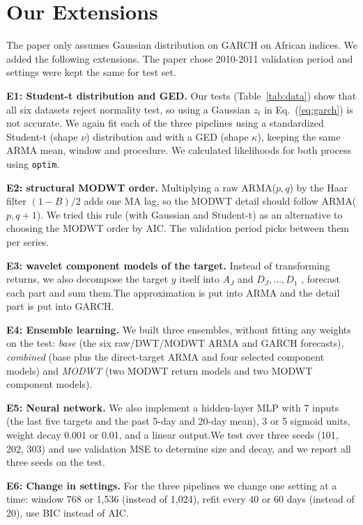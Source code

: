 \documentclass{article}
\begin{document}
\section{Our Extensions}
\label{sec:ext}

The paper only assumes Gaussian distribution on GARCH on African indices. We added the following extensions. The paper chose 2010-2011 validation period and settings were kept the same for test set.

\textbf{E1: Student-t distribution and GED.} Our tests (Table~\ref{tab:data}) show that all six datasets reject normality test, so using a Gaussian $z_t$ in Eq.~(\ref{eq:garch}) is not accurate. We again fit each of the three pipelines using a standardized Student-t (shape $\nu$) distribution and with a GED (shape $\kappa$), keeping the same ARMA mean, window and procedure. We calculated likelihoods for both process using \texttt{optim}.

\textbf{E2: structural MODWT order.} Multiplying a raw ARMA($p,q$) by the Haar filter $(1-B)/2$ adds one MA lag, so the MODWT detail should follow ARMA($p,q+1$). We tried this rule (with Gaussian and Student-t) as an alternative to choosing the MODWT order by AIC. The validation period picks between them per series.

\textbf{E3: wavelet component models of the target.} Instead of transforming returns, we also decompose the target $y$ itself into $A_J$ and $D_J,\dots,D_1$ , forecast each part and sum them.The approximation is put into ARMA and the detail part is put into GARCH.

\textbf{E4: Ensemble learning.}  We built three ensembles, without fitting any weights on the test: \emph{base} (the six raw/DWT/MODWT ARMA and GARCH forecasts), \emph{combined} (base plus the direct-target ARMA and four selected component models) and \emph{MODWT} (two MODWT return models and two MODWT component models).

\textbf{E5: Neural network.} We also implement a hidden-layer MLP  with 7 inputs (the last five targets and the past 5-day and 20-day mean), 3 or 5 sigmoid units, weight decay 0.001 or 0.01, and a linear output.We test over three seeds (101, 202, 303) and use validation MSE to determine size and decay, and we report all three seeds on the test.

\textbf{E6: Change in settings.} For the three  pipelines we change one setting at a time: window 768 or 1,536 (instead of 1,024), refit every 40 or 60 days (instead of 20), use BIC instead of AIC.
\end{document}
